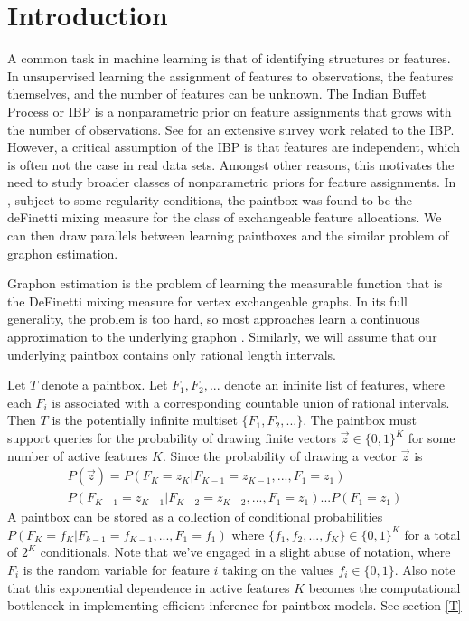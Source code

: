 \documentclass{article}
\begin{document}
\section{Introduction} \label{introduction}
A common task in machine learning is that of identifying structures or features.  In unsupervised learning the assignment of features to observations, the features themselves, and the number of features can be unknown.  The Indian Buffet Process or IBP is a nonparametric prior on feature assignments that grows with the number of observations.  See \cite{gg11} for an extensive survey work related to the IBP.  However, a critical assumption of the IBP is that features are independent, which is often not the case in real data sets.  Amongst other reasons, this motivates the need to study broader classes of nonparametric priors for feature assignments.  In \cite{BJP13}, subject to some regularity conditions, the paintbox was found to be the deFinetti mixing measure for the class of exchangeable feature allocations.  We can then draw parallels between learning paintboxes and the similar problem of graphon estimation.              

Graphon estimation is the problem of learning the measurable function that is the DeFinetti mixing measure for vertex exchangeable graphs.  In its full generality, the problem is too hard, so most approaches learn a continuous approximation to the underlying graphon \cite{WO13} \cite{GLZ14} \cite{airoldi13} \cite{borgs15}.  Similarly, we will assume that our underlying paintbox contains only rational length intervals.

Let $T$ denote a paintbox.  Let $F_1,F_2,...$ denote an infinite list of features, where each $F_i$ is associated with a corresponding countable union of rational intervals.  Then $T$ is the potentially infinite multiset $\{F_1,F_2,...\}$.  The paintbox must support queries for the probability of drawing finite vectors $\vec{z} \in \{0,1\}^K$ for some number of active features $K$.  Since the probability of drawing a vector $\vec{z}$ is 
\begin{align*}
P(\vec{z}) = P(F_K = z_K |F_{K-1} = z_{K-1},...,F_1 = z_1)\\P(F_{K-1} = z_{K-1} |F_{K-2} = z_{K-2},...,F_1 = z_1)...P(F_1 = z_1)
\end{align*}
A paintbox can be stored as a collection of conditional probabilities $P(F_K = f_K|F_{k-1}=f_{K-1},...,F_1=f_1)$ where $\{f_1,f_2,...,f_K\} \in \{0,1\}^K$ for a total of $2^K$ conditionals.  Note that we've engaged in a slight abuse of notation, where $F_i$ is the random variable for feature $i$ taking on the values $f_i \in \{0,1\}$.  Also note that this exponential dependence in active features $K$ becomes the computational bottleneck in implementing efficient inference for paintbox models.  See section \ref{T}
\end{document}
